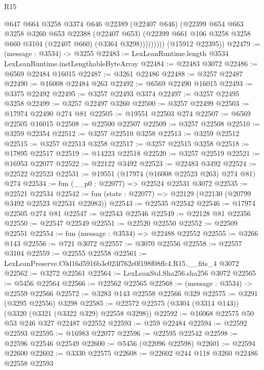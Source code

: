 \begin{lexlean}{R15}
\begin{coremodule}
                  @647
                  @664
                  @3258
                  @3374
                  @646
                  @22389
                  (@22407 @646)
                  (@22399
                    @654
                    @663
                    @3258
                    @3260
                    @653
                    @22388
                    (@22407 @653)
                    (@22399 @661 @106 @3258 @3258 @660 @3104 (@22407 @660) (@3364 @3298)))))))))
      (@15912 @22395))
@22479 := (message : @3534) -> @3255
@22483 := LexLeanRuntime.length @3534 LexLeanRuntime.instLengthableByteArray
@22484 := @22483 @3072
@22486 := @6569 @22484 @16015
@22487 := @3261 @22486
@22488 := @3257 @22487
@22490 := @16008 @22484 @263
@22492 := @6569 @22490 @16015
@22493 := @3375 @22492
@22495 := @3257 @22493 @3374
@22497 := @3257 @22495 @3258
@22499 := @3257 @22497 @3260
@22500 := @3257 @22499
@22503 := @17974 @22490 @274 @81
@22505 := @19551 @22503 @274
@22507 := @6569 @22505 @16015
@22508 := @22500 @22507
@22509 := @3257 @22508
@22510 := @3259 @22354
@22512 := @3257 @22510 @3258
@22513 := @3259 @22512
@22515 := @3257 @22513 @3258
@22517 := @3257 @22515 @3258
@22518 := @17895 @22517
@22519 := @14223 @22518
@22520 := @3257 @22519
@22521 := @16953 @22077
@22522 := @22122 @3492
@22523 := @22483 @3492
@22524 := @22522 @22523
@22531 := @19551 (@17974 (@16008 @22523 @263) @274 @81) @274
@22534 := fun (__p0 : @22077) => @22524 @22531 @3072
@22535 := @22521 @22534
@22542 := fun (state : @22077) => @22129 (@22130 (@20799 @3492 @22523 @22531 @22083))
@22543 := @22535 @22542
@22546 := @17974 @22505 @274 @81
@22547 := @22543 @22546
@22549 := @22128 @81 @22356
@22550 := @22547 @22549
@22551 := @22520 @22550
@22552 := @22509 @22551
@22554 := fun (message : @3534) => @22488 @22552
@22555 := @3266 @143
@22556 := @721 @3072
@22557 := @3070 @22556
@22558 := @22557 @3104
@22559 := @22555 @22558
@22561 := LexLeanPreserve.C0d16d5916b3c023f762e0f198f08ffc4.R15.__fits_4 @3072
@22562 := @3272 @22561
@22564 := LexLeanStd.Sha256.sha256 @3072
@22565 := @5456 @22564
@22566 := @22562 @22565
@22568 := (message : @3534) -> @22559 @22566
@22572 := @3283 @143 @22558 @22566 @329
@22575 := @3291 (@3295 @22556) @3298
@22585 := @22572 @22575 (@3304 (@3314 @143)) (@3320 (@3321 (@3322 @329) @22558 @3298))
@22592 := @16068 @22575 @50 @53 @246 @327 @22487 @22552
@22593 := @259 @22484
@22594 := @22592 @22593
@22595 := @16983 @22077
@22596 := @22595 @22542
@22598 := @22596 @22546 @22549
@22600 := @5456 (@22096 @22598)
@22601 := @22594 @22600
@22602 := @3330 @22575
@22608 := @22602 @244 @118 @3260 @22486 @22558 @22593

\end{coremodule}
\end{lexlean}
